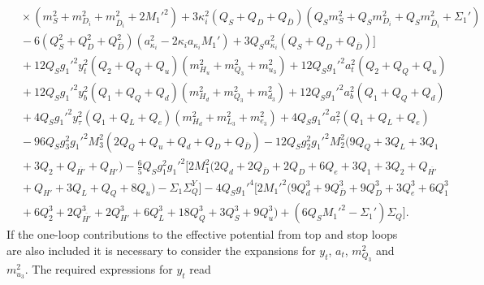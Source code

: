 \documentclass[preprint,amsmath,amssymb,aps,superscriptaddress,prd,showpacs,floatfix,nofootinbib]{revtex4-1}
\begin{document}
\begin{subequations}
\begin{align}
&{}\times\left ( m_S^2+m_{D_i}^2+m_{\overline{D}_i}^2+2M_1'^2\right )+3\kappa_i^2\left ( Q_S+Q_D+Q_{\overline{D}}\right )\left ( Q_Sm_S^2+Q_Sm_{D_i}^2+Q_Sm_{\overline{D}_i}^2+\Sigma_1'\right )\nonumber\\
&{}-6\left ( Q_S^2+Q_D^2+Q_{\overline{D}}^2\right )\left ( a_{\kappa_i}^2-2\kappa_i a_{\kappa_i}M_1'\right )+3Q_Sa_{\kappa_i}^2\left ( Q_S+Q_D+Q_{\overline{D}}\right )\Big ]\nonumber\\
&{}+12Q_Sg_1'^2y_t^2\left ( Q_2+Q_Q+Q_u\right )\left ( m_{H_u}^2+m_{Q_3}^2+m_{u_3}^2\right )+12Q_Sg_1'^2a_t^2\left ( Q_2+Q_Q+Q_u\right )\nonumber\\
&{}+12Q_Sg_1'^2y_b^2\left ( Q_1+Q_Q+Q_d\right )\left ( m_{H_d}^2+m_{Q_3}^2+m_{d_3}^2\right )+12Q_Sg_1'^2a_b^2\left ( Q_1+Q_Q+Q_d\right )\nonumber\\
&{}+4Q_Sg_1'^2y_\tau^2\left ( Q_1+Q_L+Q_e\right )\left ( m_{H_d}^2+m_{L_3}^2+m_{e_3}^2\right )+4Q_Sg_1'^2a_\tau^2\left ( Q_1+Q_L+Q_e\right )\nonumber\\
&{}-96Q_Sg_3^2g_1'^2M_3^2\left ( 2Q_Q+Q_u+Q_d+Q_D+Q_{\overline{D}}\right )-12Q_Sg_2^2g_1'^2M_2^2\big ( 9Q_Q+3Q_L+3Q_1\nonumber\\
&{}+3Q_2+Q_{\overline{H'}}+Q_{H'}\big )-\frac{6}{5}Q_Sg_1^2g_1'^2\Big [ 2M_1^2\big ( 2Q_d+2Q_{\overline{D}}+2Q_D+6Q_e+3Q_1+3Q_2+Q_{\overline{H'}}\nonumber\\
&{}+Q_{H'}+3Q_L+Q_Q+8Q_u\big )-\Sigma_1\Sigma_Q^Y\Big ]-4Q_Sg_1'^4\Big [ 2M_1'^2\big ( 9Q_d^3+9Q_{\overline{D}}^3+9Q_D^3+3Q_e^3+6Q_1^3\nonumber\\
&{}+6Q_2^3+2Q_{\overline{H'}}^3+2Q_{H'}^3+6Q_L^3+18Q_Q^3+3Q_S^3+9Q_u^3\big )+\left ( 6Q_SM_1'^2-\Sigma_1'\right )\Sigma_Q\Big ].\label{eq:USSMms2Ot2Coeff}
\end{align}
\end{subequations}
If the one-loop contributions to the effective potential from top and stop loops are also included it is necessary to consider the expansions for $y_t$, $a_t$, $m_{Q_3}^2$ and $m_{u_3}^2$. The required expressions for $y_t$ read
\end{document}
